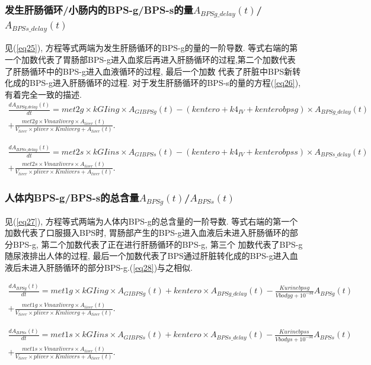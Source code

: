 \documentclass[a4paper,punct=banjiao,twoside]{ctexrep}
\theoremstyle{plain}
\theoremstyle{definition}
\theoremstyle{remark}
\begin{document}
\subsubsection*{发生肝肠循环/小肠内的BPS-g/BPS-s的量$A_{BPSg\_delay}(t)$/$A_{BPSs\_delay}(t)$}
见(\ref{eq25}), 方程等式两端为发生肝肠循环的BPS-g的量的一阶导数. 等式右端的第一个加数代表了胃肠部BPS-g进入血浆后再进入肝肠循环的过程,第二个加数代表了肝肠循环中的BPS-g进入血液循环的过程, 最后一个加数
代表了肝脏中BPS新转化成的BPS-g进入肝肠循环的过程. 对于发生肝肠循环的BPS-s的量的方程(\ref{eq26}), 有着完全一致的描述.
\begin{multline}\label{eq25}
  \frac{dA_{BPSg\_delay}(t)}{dt}=met2g \times  kGIing \times  A_{GIBPSg}(t)-(kentero+k4_{IV}+kenterobpsg) \times  A_{BPSg\_delay}(t)\\
  +\frac{met2g \times  Vmaxliverg \times  A_{liver}(t)}{V_{liver}  \times  pliver \times  Kmliverg+A_{liver}(t)}.
\end{multline}

\begin{multline}\label{eq26}
  \frac{dA_{BPSs\_delay}(t)}{dt}=met2s \times  kGIins \times  A_{GIBPSs}(t)-(kentero+k4_{IV}+kenterobpss) \times  A_{BPSs\_delay}(t)\\
  +\frac{met2s \times  Vmaxlivers \times  A_{liver}(t)}{V_{liver}  \times  pliver \times  Kmlivers+A_{liver}(t)}.
\end{multline}

\subsubsection*{人体内BPS-g/BPS-s的总含量$A_{BPSg}(t)$/$A_{BPSs}(t)$}
见(\ref{eq27}), 方程等式两端为人体内BPS-g的总含量的一阶导数. 等式右端的第一个加数代表了口服摄入BPS时, 胃肠部产生的BPS-g进入血液后未进入肝肠循环的部分BPS-g, 第二个加数代表了正在进行肝肠循环的BPS-g, 第三个
加数代表了BPS-g随尿液排出人体的过程, 最后一个加数代表了BPS通过肝脏转化成的BPS-g进入血液后未进入肝肠循环的部分BPS-g.(\ref{eq28})与之相似.

\begin{multline}\label{eq27}
  \frac{dA_{BPSg}(t)}{dt}=met1g \times  kGIing \times  A_{GIBPSg}(t)+kentero \times  A_{BPSg\_delay}(t)-\frac{Kurinebpsg}{Vbodyg+10^{-34} } A_{BPSg}(t)\\
  +\frac{met1g \times  Vmaxliverg \times  A_{liver}(t)}{V_{liver}  \times  pliver \times  Kmliverg+A_{liver}(t)}.
\end{multline}

\begin{multline}\label{eq28}
  \frac{dA_{BPSs}(t)}{dt}=met1s \times  kGIins \times  A_{GIBPSs}(t)+kentero \times  A_{BPSs\_delay}(t)-\frac{Kurinebpss}{Vbodys+10^{-34}} A_{BPSs}(t)\\
  +\frac{met1s \times  Vmaxlivers \times  A_{liver}(t)}{V_{liver}  \times  pliver \times  Kmlivers+A_{liver}(t)}.
\end{multline}
\end{document}
